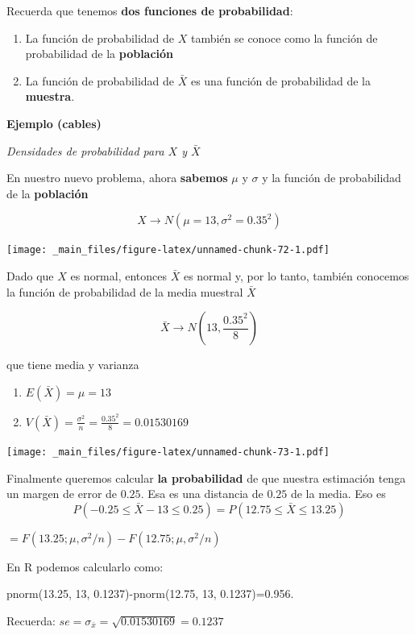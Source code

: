 \documentclass[
]{book}
\providecommand{\tightlist}{%
  \setlength{\itemsep}{0pt}\setlength{\parskip}{0pt}}
\begin{document}
Recuerda que tenemos \textbf{dos funciones de probabilidad}:

\begin{enumerate}
\def\labelenumi{\arabic{enumi}.}
\item
  La función de probabilidad de \(X\) también se conoce como la función de probabilidad de la \textbf{población}
\item
  La función de probabilidad de \(\bar{X}\) es una función de probabilidad de la \textbf{muestra}.
\end{enumerate}

\textbf{Ejemplo (cables)}

\emph{Densidades de probabilidad para \(X\) y \(\bar{X}\)}

En nuestro nuevo problema, ahora \textbf{sabemos} \(\mu\) y \(\sigma\) y la función de probabilidad de la \textbf{población}

\[X \rightarrow N(\mu=13, \sigma^2=0.35^2)\]

\texttt{[image: \_main\_files/figure-latex/unnamed-chunk-72-1.pdf]}

Dado que \(X\) es normal, entonces \(\bar{X}\) es normal y, por lo tanto, también conocemos la función de probabilidad de la media muestral \(\bar{X}\)

\[\bar{X} \rightarrow N(13, \frac{0.35^2}{8})\]

que tiene media y varianza

\begin{enumerate}
\def\labelenumi{\arabic{enumi})}
\tightlist
\item
  \(E(\bar{X})=\mu=13\)
\item
  \(V(\bar{X})=\frac{\sigma^2}{n}=\frac{0.35^2}{8}=0.01530169\)
\end{enumerate}

\texttt{[image: \_main\_files/figure-latex/unnamed-chunk-73-1.pdf]}

Finalmente queremos calcular \textbf{la probabilidad} de que nuestra estimación tenga un margen de error de \(0.25\). Esa es una distancia de \(0.25\) de la media. Eso es \[P(-0.25 \leq \bar{X} - 13\leq 0.25)=P(12.75 \leq \bar{X} \leq 13.25)\]

\(=F(13.25; \mu, \sigma^2/n)-F(12.75; \mu, \sigma^2/n)\)

En R podemos calcularlo como:

pnorm(13.25, 13, 0.1237)-pnorm(12.75, 13, 0.1237)=0.956.

Recuerda: \(se=\sigma_{\bar{x}}=\sqrt{0.01530169}=0.1237\)
\end{document}
